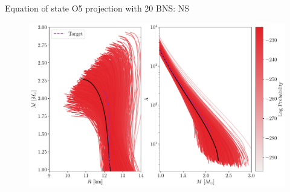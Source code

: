 \documentclass[usenames,dvipsnames,t]{beamer}
\begin{document}
\begin{frame}{Equation of state O5 projection with 20 BNS: NS}
  \begin{figure}
    \centering
    \includegraphics[scale=0.40]{Figures/postprocessing_NS.pdf}
  \end{figure}
\end{frame}
\end{document}
